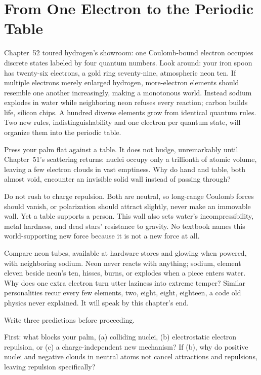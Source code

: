 \chapter{From One Electron to the Periodic Table}

Chapter~52 toured hydrogen's showroom: one Coulomb-bound electron occupies discrete states labeled by four quantum numbers. Look around: your iron spoon has twenty-six electrons, a gold ring seventy-nine, atmospheric neon ten. If multiple electrons merely enlarged hydrogen, more-electron elements should resemble one another increasingly, making a monotonous world. Instead sodium explodes in water while neighboring neon refuses every reaction; carbon builds life, silicon chips. A hundred diverse elements grow from identical quantum rules. Two new rules, indistinguishability and one electron per quantum state, will organize them into the periodic table.


Press your palm flat against a table. It does not budge, unremarkably until Chapter~51's scattering returns: nuclei occupy only a trillionth of atomic volume, leaving a few electron clouds in vast emptiness. Why do hand and table, both almost void, encounter an invisible solid wall instead of passing through?

Do not rush to charge repulsion. Both are neutral, so long-range Coulomb forces should vanish, or polarization should attract slightly, never make an immovable wall. Yet a table supports a person. This wall also sets water's incompressibility, metal hardness, and dead stars' resistance to gravity. No textbook names this world-supporting new force because it is not a new force at all.

Compare neon tubes, available at hardware stores and glowing when powered, with neighboring sodium. Neon never reacts with anything; sodium, element eleven beside neon's ten, hisses, burns, or explodes when a piece enters water. Why does one extra electron turn utter laziness into extreme temper? Similar personalities recur every few elements, two, eight, eight, eighteen, a code old physics never explained. It will speak by this chapter's end.


Write three predictions before proceeding.

First: what blocks your palm, (a) colliding nuclei, (b) electrostatic electron repulsion, or (c) a charge-independent new mechanism? If (b), why do positive nuclei and negative clouds in neutral atoms not cancel attractions and repulsions, leaving repulsion specifically?

